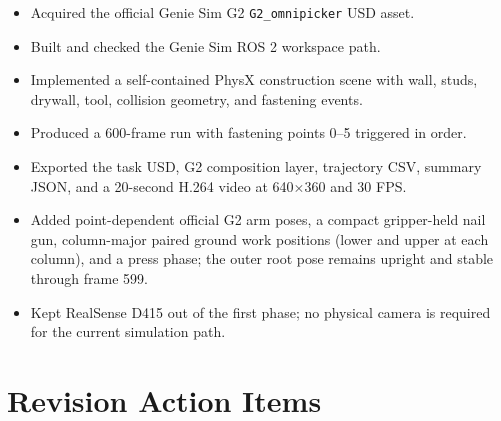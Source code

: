 \documentclass[11pt,a4paper]{article}
\begin{document}
\begin{itemize}[leftmargin=2em]
  \item Acquired the official Genie Sim G2 \texttt{G2\_omnipicker} USD asset.
  \item Built and checked the Genie Sim ROS 2 workspace path.
  \item Implemented a self-contained PhysX construction scene with wall, studs,
        drywall, tool, collision geometry, and fastening events.
  \item Produced a 600-frame run with fastening points 0--5 triggered in order.
  \item Exported the task USD, G2 composition layer, trajectory CSV, summary JSON,
        and a 20-second H.264 video at 640$\times$360 and 30 FPS.
  \item Added point-dependent official G2 arm poses, a compact gripper-held nail gun,
        column-major paired ground work positions (lower and upper at each column),
        and a press phase; the outer root pose remains upright and stable through
        frame 599.
  \item Kept RealSense D415 out of the first phase; no physical camera is required
        for the current simulation path.
\end{itemize}

\section{Revision Action Items}
\end{document}
